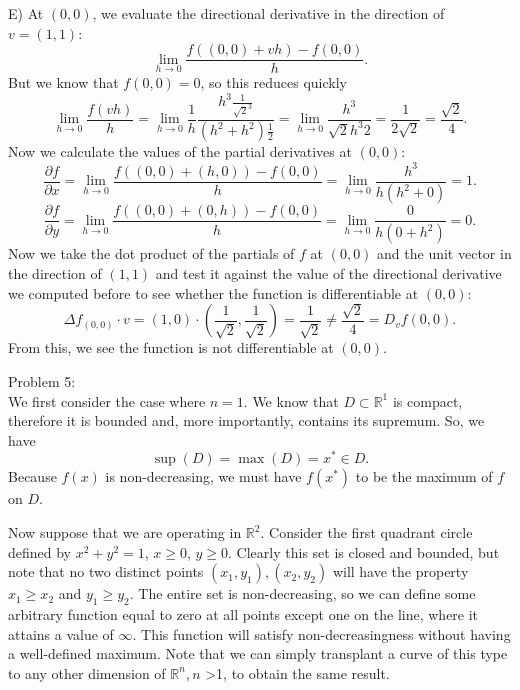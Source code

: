 \documentclass[12pt,leqno]{article}
\begin{document}
\indent E) At $(0, 0)$, we evaluate the directional derivative in the direction of $v=(1, 1)$:
$$\lim_{h \rightarrow 0} \frac{f((0, 0) + vh) - f(0, 0)}{h}.$$
But we know that $f(0, 0) = 0$, so this reduces quickly
$$\lim_{h \rightarrow 0} \frac{f(vh)}{h}=\lim_{h \rightarrow 0}\frac{1}{h}\frac{h^3 \frac{1}{\sqrt{2}^3}}{(h^2 + h^2)\frac{1}{2}}=\lim_{h \rightarrow 0}\frac{h^3}{\sqrt{2}h^3 2} = \frac{1}{2\sqrt{2}} = \frac{\sqrt{2}}{4}.$$
Now we calculate the values of the partial derivatives at $(0, 0)$:
$$\frac{\partial f}{\partial x} = \lim_{h \rightarrow 0}\frac{f((0, 0) + (h, 0)) - f(0, 0)}{h} = \lim_{h \rightarrow 0}\frac{h^3}{h(h^2 + 0)} = 1.$$
$$\frac{\partial f}{\partial y} = \lim_{h \rightarrow 0}\frac{f((0, 0) + (0, h)) - f(0, 0)}{h} =\lim_{h \rightarrow 0} \frac{0}{h(0 + h^2)} = 0.$$ 
Now we take the dot product of the partials of $f$ at $(0, 0)$ and the unit vector in the direction of $(1, 1)$ and test it against the value of the directional derivative we computed before to see whether the function is differentiable at $(0, 0)$:
$$\Delta f_{(0, 0)} \cdot v = (1, 0) \cdot \left(\frac{1}{\sqrt{2}}, \frac{1}{\sqrt{2}}\right) = \frac{1}{\sqrt{2}} \neq \frac{\sqrt{2}}{4} = D_v f(0, 0).$$
From this, we see the function is not differentiable at $(0, 0)$. 

\bigskip
\noindent Problem 5:\\
\indent We first consider the case where $n=1$. We know that $D \subset \mathds{R}^1$ is compact, therefore it is bounded and, more importantly, contains its supremum. So, we have
$$\sup(D) = \max(D) = x^* \in D.$$
Because $f(x)$ is non-decreasing, we must have $f(x^*)$ to be the maximum of $f$ on $D$.

Now suppose that we are operating in $\mathds{R}^2$. Consider the first quadrant circle defined by $x^2 + y^2 = 1$, $x \geq 0$, $y \geq 0$. Clearly this set is closed and bounded, but note that no two distinct points $(x_1, y_1), (x_2, y_2)$ will have the property $x_1 \geq x_2$ and $y_1 \geq y_2$. The entire set is non-decreasing, so we can define some arbitrary function equal to zero at all points except one on the line, where it attains a value of $\infty$. This function will satisfy non-decreasingness without having a well-defined maximum. Note that we can simply transplant a curve of this type to any other dimension of $\mathds{R}^n, n$ \textgreater 1, to obtain the same result.
\end{document}
